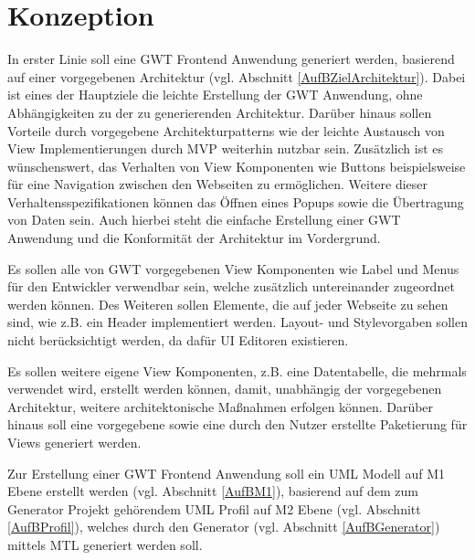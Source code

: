 \chapter{Konzeption}
\label{Konzeption}
In erster Linie soll eine GWT Frontend Anwendung generiert werden, basierend auf
einer vorgegebenen Architektur (vgl. Abschnitt \ref{AufBZielArchitektur}). Dabei
ist eines der Hauptziele die leichte Erstellung der GWT Anwendung, ohne
Abhängigkeiten zu der zu generierenden Architektur. Darüber hinaus sollen
Vorteile durch vorgegebene Architekturpatterns wie der leichte Austausch von
View Implementierungen durch MVP weiterhin nutzbar sein. Zusätzlich ist es
wünschenswert, das Verhalten von View Komponenten wie Buttons beispielsweise für eine Navigation
zwischen den Webseiten zu ermöglichen. Weitere dieser Verhaltensspezifikationen
können das Öffnen eines Popups sowie die Übertragung von Daten sein. Auch hierbei
steht die einfache Erstellung einer GWT Anwendung und die Konformität
der Architektur im Vordergrund.

Es sollen alle von GWT vorgegebenen View Komponenten wie Label und
Menus für den Entwickler verwendbar sein, welche zusätzlich
untereinander zugeordnet werden können. Des Weiteren sollen Elemente, die auf
jeder Webseite zu sehen sind, wie z.B. ein Header implementiert werden. Layout-
und Stylevorgaben sollen nicht berücksichtigt werden, da dafür UI Editoren
existieren.

Es sollen weitere eigene View Komponenten, z.B. eine Datentabelle, die mehrmals
verwendet wird, erstellt werden können, damit, unabhängig der vorgegebenen
Architektur, weitere architektonische Maßnahmen erfolgen können. Darüber hinaus soll
eine vorgegebene sowie eine durch den Nutzer erstellte Paketierung
für Views generiert werden.

Zur Erstellung einer GWT Frontend Anwendung soll ein UML Modell auf M1 Ebene
erstellt werden (vgl. Abschnitt \ref{AufBM1}), basierend auf dem zum
Generator Projekt gehörendem UML Profil auf M2 Ebene (vgl. Abschnitt
\ref{AufBProfil}), welches durch den Generator (vgl. Abschnitt \ref{AufBGenerator}) mittels
MTL generiert werden soll.

